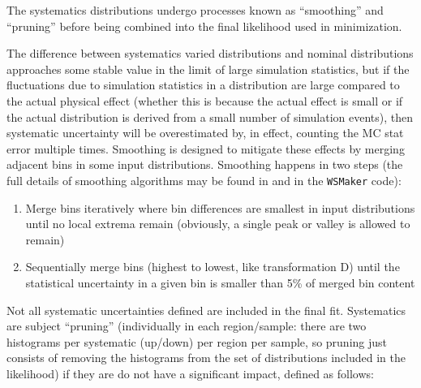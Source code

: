 The systematics distributions undergo processes known as ``smoothing'' and ``pruning'' before being combined into the final likelihood used in minimization.

The difference between systematics varied distributions and nominal distributions approaches some stable value in the limit of large simulation statistics, but if the fluctuations due to simulation statistics in a distribution are large compared to the actual physical effect (whether this is because the actual effect is small or if the actual distribution is derived from a small number of simulation events), then systematic uncertainty will be overestimated by, in effect, counting the MC stat error multiple times.  Smoothing is designed to mitigate these effects by merging adjacent bins in some input distributions.  Smoothing happens in two steps (the full details of smoothing algorithms may be found in \cite{supportnote} and in the \texttt{WSMaker} code):
\begin{enumerate}
\item Merge bins iteratively where bin differences are smallest in input distributions until no local extrema remain (obviously, a single peak or valley is allowed to remain)
\item Sequentially merge bins (highest to lowest, like transformation D) until the statistical uncertainty in a given bin is smaller than 5\% of merged bin content
\end{enumerate}


Not all systematic uncertainties defined are included in the final fit.  
Systematics are subject ``pruning'' (individually in each  region/sample: there are two histograms per systematic (up/down) per region per sample, so pruning just consists of removing the histograms from the set of distributions included in the likelihood) if they are do not have a significant impact, defined as follows:

